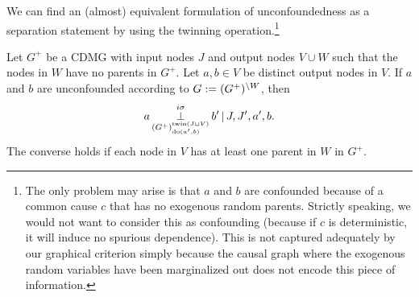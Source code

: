 We can find an (almost) equivalent formulation of unconfoundedness as a separation statement by using the twinning operation.\footnote{The only problem may arise is that $a$ and $b$ are confounded because of a common cause $c$ that has no exogenous random parents. Strictly speaking, we would not want to consider this as confounding (because if $c$ is deterministic, it will induce no spurious dependence). This is not captured adequately by our graphical criterion simply because the causal graph where the exogenous random variables have been marginalized out does not encode this piece of information.}
\begin{Prp}\label{prp:graph_unconfounded2}
  Let $G^+$ be a CDMG with input nodes $J$ and output nodes $V \cup W$ such that the nodes in $W$ have no parents in $G^+$.
  Let $a,b \in V$ be distinct output nodes in $V$.
  If $a$ and $b$ are unconfounded according to $G := (G^+)^{\setminus W}$, then
  $$a \operatorname*{\perp}^{i\sigma}_{(G^+)^{\mathrm{twin}(J \cup V)}_{\operatorname{do}(a',b)}} b' \operatorname*{|} J, J', a', b.$$
  The converse holds if each node in $V$ has at least one parent in $W$ in $G^+$.
\end{Prp}
